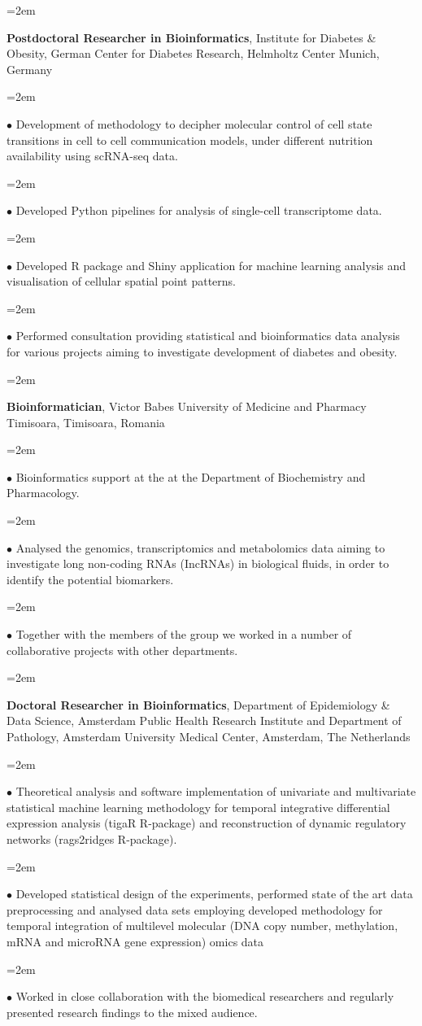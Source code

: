 \documentclass{scrartcl}
\newcommand{\MarginText}[1]{\marginpar{\raggedleft\itshape\small#1}} %
\newcommand{\Description}[1]{\hangindent=2em\hangafter=0\noindent\raggedright\footnotesize{#1}\par\normalsize\vspace{1em}} %
\begin{document}
\begin{cv}{}
\Description{\MarginText{02/2019-}\textbf{Postdoctoral Researcher in Bioinformatics}, 
Institute for Diabetes \& Obesity, German Center for Diabetes Research, Helmholtz Center Munich, Germany}
\Description{$\bullet$ Development of methodology to decipher molecular control of cell state transitions in cell to cell communication models, under different nutrition availability using scRNA-seq data.}
\vspace{-10pt}
\Description{ $\bullet$ Developed Python pipelines for analysis of single-cell transcriptome data. }
\vspace{-10pt}
\Description{ $\bullet$ Developed R package and Shiny application for machine learning analysis and visualisation of cellular spatial point patterns. }
\vspace{-10pt}
\Description{ $\bullet$  Performed consultation providing statistical and bioinformatics data analysis for various projects aiming to investigate development of diabetes and obesity.}

\Description{\MarginText{09/2017-09/2019}\textbf{Bioinformatician}, 
Victor Babes University of Medicine and Pharmacy Timisoara, Timisoara, Romania}
\Description{$\bullet$  Bioinformatics support at the at the Department of Biochemistry and Pharmacology.} 
\vspace{-10pt}
\Description{$\bullet$ Analysed the genomics, transcriptomics and metabolomics data aiming to investigate long non-coding RNAs (IncRNAs) in biological fluids, in order to identify the potential biomarkers. }
\vspace{-10pt}
\Description{$\bullet$ Together with the members of the group we worked in a number of collaborative projects with other departments.}

\Description{\MarginText{01/2012-10/2016}\textbf{Doctoral Researcher in Bioinformatics}, 
Department of Epidemiology \& Data Science, Amsterdam Public Health Research Institute and Department of Pathology, Amsterdam University Medical Center, Amsterdam, The Netherlands}
\Description{$\bullet$ Theoretical analysis and software implementation of univariate and multivariate statistical machine learning methodology for temporal integrative differential expression analysis (tigaR R-package) and reconstruction of dynamic regulatory networks (rags2ridges R-package). }
\vspace{-10pt}
\Description{$\bullet$ Developed statistical design of the experiments, performed state of the art data preprocessing and analysed data sets employing developed methodology for temporal integration of  multilevel molecular (DNA copy number, methylation, mRNA and microRNA gene expression) omics data}
\vspace{-10pt}
\Description{$\bullet$ Worked in close collaboration with the biomedical researchers and regularly presented research findings to the mixed audience. }


\end{cv}
\end{document}

